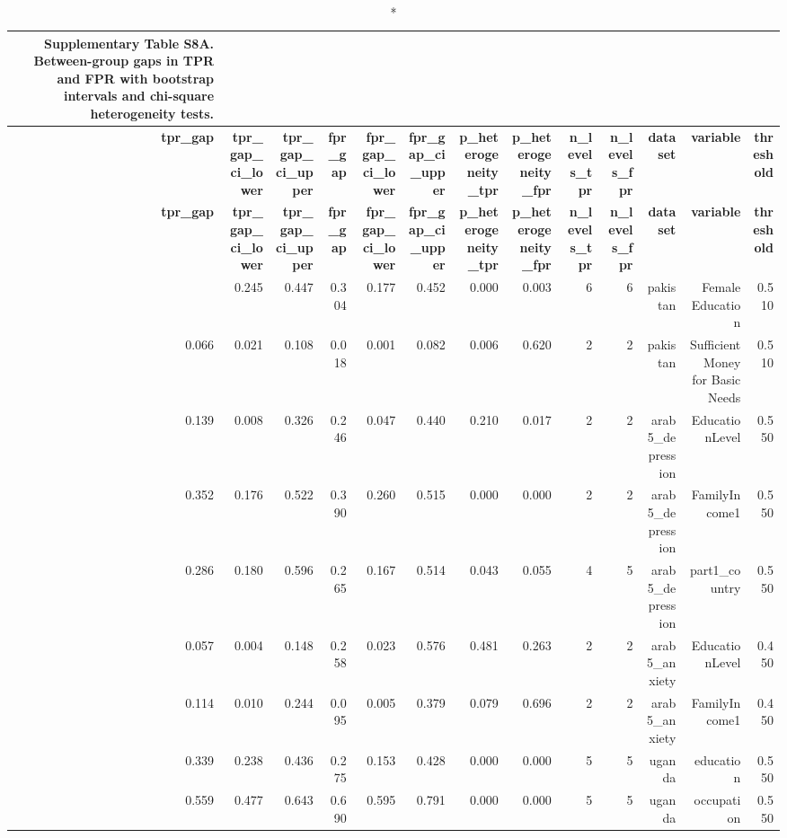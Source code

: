 \documentclass[10pt]{article}
\begin{document}
\tiny
\setlength{\tabcolsep}{2pt}
\begin{longtable}{rrrrrrrrrrrrr}
\caption*{\textbf{Supplementary Table S8A.} Between-group gaps in TPR and FPR with bootstrap intervals and chi-square heterogeneity tests.}\\
\toprule
\textbf{tpr\_gap} & \textbf{tpr\_gap\_ci\_lower} & \textbf{tpr\_gap\_ci\_upper} & \textbf{fpr\_gap} & \textbf{fpr\_gap\_ci\_lower} & \textbf{fpr\_gap\_ci\_upper} & \textbf{p\_heterogeneity\_tpr} & \textbf{p\_heterogeneity\_fpr} & \textbf{n\_levels\_tpr} & \textbf{n\_levels\_fpr} & \textbf{dataset} & \textbf{variable} & \textbf{threshold} \\
\midrule
\endfirsthead
\toprule
\textbf{tpr\_gap} & \textbf{tpr\_gap\_ci\_lower} & \textbf{tpr\_gap\_ci\_upper} & \textbf{fpr\_gap} & \textbf{fpr\_gap\_ci\_lower} & \textbf{fpr\_gap\_ci\_upper} & \textbf{p\_heterogeneity\_tpr} & \textbf{p\_heterogeneity\_fpr} & \textbf{n\_levels\_tpr} & \textbf{n\_levels\_fpr} & \textbf{dataset} & \textbf{variable} & \textbf{threshold} \\
\midrule
\endhead
\bottomrule
\endfoot
0.343 & 0.245 & 0.447 & 0.304 & 0.177 & 0.452 & 0.000 & 0.003 & 6 & 6 & pakistan & Female Education & 0.510 \\
0.066 & 0.021 & 0.108 & 0.018 & 0.001 & 0.082 & 0.006 & 0.620 & 2 & 2 & pakistan & Sufficient Money for Basic Needs & 0.510 \\
0.139 & 0.008 & 0.326 & 0.246 & 0.047 & 0.440 & 0.210 & 0.017 & 2 & 2 & arab5\_depression & EducationLevel & 0.550 \\
0.352 & 0.176 & 0.522 & 0.390 & 0.260 & 0.515 & 0.000 & 0.000 & 2 & 2 & arab5\_depression & FamilyIncome1 & 0.550 \\
0.286 & 0.180 & 0.596 & 0.265 & 0.167 & 0.514 & 0.043 & 0.055 & 4 & 5 & arab5\_depression & part1\_country & 0.550 \\
0.057 & 0.004 & 0.148 & 0.258 & 0.023 & 0.576 & 0.481 & 0.263 & 2 & 2 & arab5\_anxiety & EducationLevel & 0.450 \\
0.114 & 0.010 & 0.244 & 0.095 & 0.005 & 0.379 & 0.079 & 0.696 & 2 & 2 & arab5\_anxiety & FamilyIncome1 & 0.450 \\
0.339 & 0.238 & 0.436 & 0.275 & 0.153 & 0.428 & 0.000 & 0.000 & 5 & 5 & uganda & education & 0.550 \\
0.559 & 0.477 & 0.643 & 0.690 & 0.595 & 0.791 & 0.000 & 0.000 & 5 & 5 & uganda & occupation & 0.550 \\
\bottomrule
\end{longtable}
\normalsize
\end{document}
